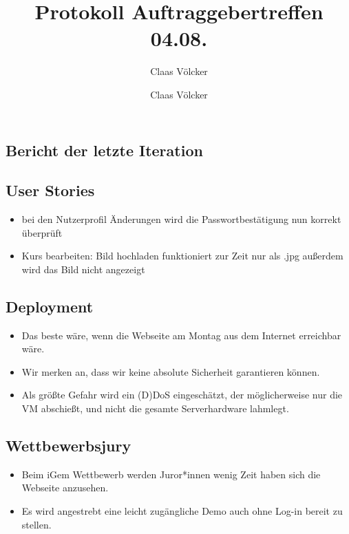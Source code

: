 \documentclass[colorback, accentcolor=tud1c, paper=a4]{tudexercise}
\title{Protokoll Auftraggebertreffen 04.08.}
\subtitle{Claas Völcker}
\author{Claas Völcker}
\begin{document}
\maketitle

\begin{multicols}{2}

\section*{Bericht der letzte Iteration}
\subsection*{User Stories}
\begin{itemize}
	\item bei den Nutzerprofil Änderungen wird die Passwortbestätigung nun korrekt überprüft
	\item Kurs bearbeiten: Bild hochladen funktioniert zur Zeit nur als .jpg außerdem wird das Bild nicht angezeigt

\end{itemize}

\subsection*{Deployment}
\begin{itemize}
	\item Das beste wäre, wenn die Webseite am Montag aus dem Internet erreichbar wäre.
	\item Wir merken an, dass wir keine absolute Sicherheit garantieren können.
	\item Als größte Gefahr wird ein (D)DoS eingeschätzt, der möglicherweise nur die VM abschießt, und nicht die gesamte Serverhardware lahmlegt.
	
\end{itemize}

\subsection*{Wettbewerbsjury}
\begin{itemize}
	\item Beim iGem Wettbewerb werden Juror*innen wenig Zeit haben sich die Webseite anzusehen.
	\item Es wird angestrebt eine leicht zugängliche Demo auch ohne Log-in bereit zu stellen.

\end{itemize}


\end{multicols}
\end{document}
